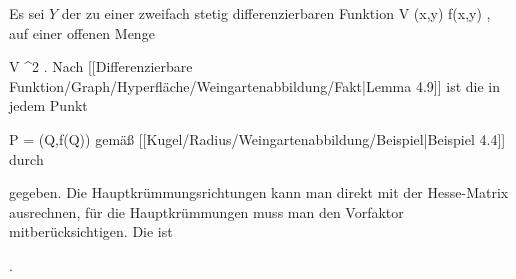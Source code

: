 {

Es sei $Y$ der
zu einer zweifach stetig differenzierbaren Funktion
 { V } { \R
} {(x,y)} { f(x,y)
} {,}
auf einer offenen Menge

\mavergleichskette
{\vergleichskette
{ V
}
{ \subseteq }{ \R^2
}
{  }{
}
{    }{
}
{   }{
}
}
{}{}{.}
Nach
[[Differenzierbare Funktion/Graph/Hyperfläche/Weingartenabbildung/Fakt|Lemma 4.9]]
ist die
 {} {}
in jedem Punkt

\mavergleichskette
{\vergleichskette
{ P
}
{ = }{ (Q,f(Q))
}
{  }{
}
{    }{
}
{   }{
}
}
{}{}{}
gemäß
[[Kugel/Radius/Weingartenabbildung/Beispiel|Beispiel 4.4]]
durch

 {  }

gegeben. Die Hauptkrümmungsrichtungen kann man direkt mit der Hesse-Matrix ausrechnen, für die Hauptkrümmungen muss man den Vorfaktor mitberücksichtigen. Die
ist

 { . }

}

